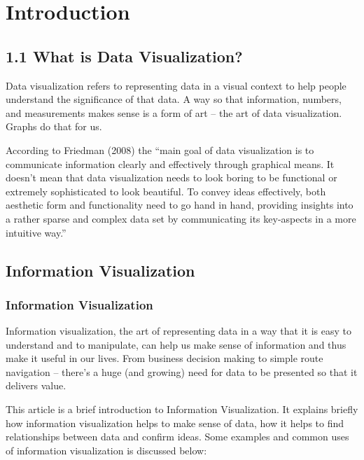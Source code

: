 \documentclass[]{book}
\theoremstyle{definition}
\theoremstyle{definition}
\theoremstyle{definition}
\theoremstyle{remark}
\begin{document}
\chapter{Introduction}\label{introduction}

\section{1.1 What is Data
Visualization?}\label{what-is-data-visualization}

Data visualization refers to representing data in a visual context to
help people understand the significance of that data. A way so that
information, numbers, and measurements makes sense is a form of art --
the art of data visualization. Graphs do that for us.

According to Friedman (2008) the ``main goal of data visualization is to
communicate information clearly and effectively through graphical means.
It doesn't mean that data visualization needs to look boring to be
functional or extremely sophisticated to look beautiful. To convey ideas
effectively, both aesthetic form and functionality need to go hand in
hand, providing insights into a rather sparse and complex data set by
communicating its key-aspects in a more intuitive way.''

\citep{viz}

\section{Information Visualization}\label{information-visualization}

\subsection{Information
Visualization}\label{information-visualization-1}

Information visualization, the art of representing data in a way that it
is easy to understand and to manipulate, can help us make sense of
information and thus make it useful in our lives. From business decision
making to simple route navigation -- there's a huge (and growing) need
for data to be presented so that it delivers value.

This article is a brief introduction to Information Visualization. It
explains briefly how information visualization helps to make sense of
data, how it helps to find relationships between data and confirm ideas.
Some examples and common uses of information visualization is discussed
below:
\end{document}
